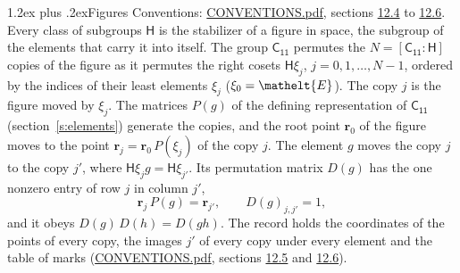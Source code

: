 \documentclass[10pt,a4paper]{article}
\makeatletter
\renewcommand\section{\@startsection{section}{1}{\z@}{-3ex plus -1ex minus -.2ex}%
  {1.2ex plus .2ex}{\normalfont\large\sffamily\bfseries\color{parttitle}}}
\numberwithin{equation}{section}
\newcommand{\eltfont}[1]{{\let\sigma\eltsigma\mathelt{#1}}}
\newcommand{\grp}[1]{\mathsf{#1}}
\newcommand{\cls}[1]{\eltfont{#1}}
\newcommand{\pointr}{\mathbf{r}}
\makeatother
\begin{document}
\section{Figures}\label{s:permutation}
Conventions: \href{../../CONVENTIONS.pdf}{CONVENTIONS.pdf}, sections \href{../../CONVENTIONS.pdf\#conv.12.4}{12.4} to \href{../../CONVENTIONS.pdf\#conv.12.6}{12.6}.
Every class of subgroups $\grp{H}$ is the stabilizer of a figure in space, the subgroup of the elements that carry it into itself. \label{n:local.orbit.size}\label{n:element.coset.least}\label{n:index.coset}The group $\grp{C_{11}}$ permutes the $N = [\grp{C_{11}} : \grp{H}]$ copies of the figure as it permutes the right cosets $\grp{H}\xi_j$, $j = 0, 1, \dots, N - 1$, ordered by the indices of their least elements $\xi_j$ ($\xi_0 = \cls{E}$). The copy $j$ is the figure moved by $\xi_j$. The matrices $P(g)$ of the defining representation of $\grp{C_{11}}$ (section~\ref{s:elements}) generate the copies, and the root point $\pointr_0$ of the figure moves to the point $\pointr_j = \pointr_0\, P(\xi_j)$ of the copy $j$. \label{n:local.coset.image}The element $g$ moves the copy $j$ to the copy $j'$, where $\grp{H}\xi_j g = \grp{H}\xi_{j'}$. \label{n:local.matrix.permutation}Its permutation matrix $D(g)$ has the one nonzero entry of row $j$ in column $j'$,
\begin{equation}\label{e:perm.matrix}\pointr_j\, P(g) = \pointr_{j'}, \qquad D(g)_{j,j'} = 1,\end{equation}
and it obeys $D(g)\, D(h) = D(gh)$. The record holds the coordinates of the points of every copy, the images $j'$ of every copy under every element and the table of marks (\href{../../CONVENTIONS.pdf}{CONVENTIONS.pdf}, sections \href{../../CONVENTIONS.pdf\#conv.12.5}{12.5} and \href{../../CONVENTIONS.pdf\#conv.12.6}{12.6}).
\end{document}
